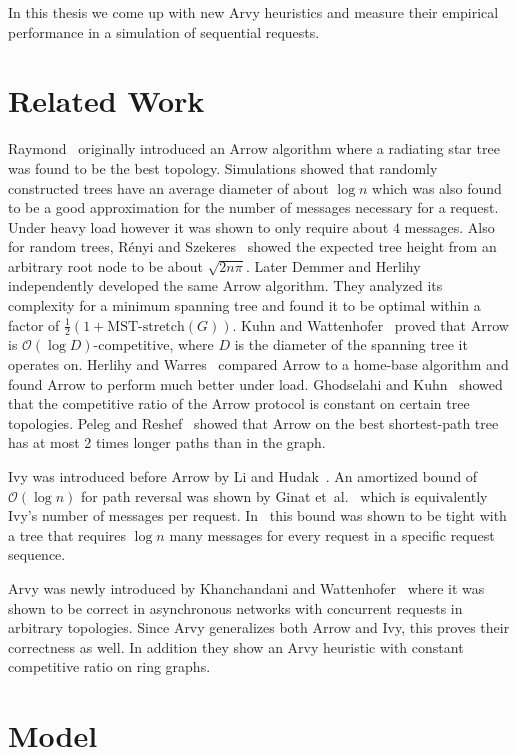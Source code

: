 \documentclass[a4paper, oneside]{discothesis}
\begin{document}
In this thesis we come up with new Arvy heuristics and measure their empirical performance in a simulation of sequential requests.

\section{Related Work}

Raymond~\cite{Ray} originally introduced an Arrow algorithm where a radiating star tree was found to be the best topology. Simulations showed that randomly constructed trees have an average diameter of about $\log n$ which was also found to be a good approximation for the number of messages necessary for a request. Under heavy load however it was shown to only require about $4$ messages. Also for random trees, R{\'e}nyi and Szekeres~\cite{Height} showed the expected tree height from an arbitrary root node to be about $\sqrt{2n\pi}$. Later Demmer and Herlihy~\cite{Arrow} independently developed the same Arrow algorithm. They analyzed its complexity for a minimum spanning tree and found it to be optimal within a factor of $\frac{1}{2}(1+\text{MST-stretch}(G))$. Kuhn and Wattenhofer~\cite{Kuhn} proved that Arrow is $\mathcal{O}(\log D)$-competitive, where $D$ is the diameter of the spanning tree it operates on. Herlihy and Warres~\cite{Tale} compared Arrow to a home-base algorithm and found Arrow to perform much better under load. Ghodselahi and Kuhn~\cite{Ghod} showed that the competitive ratio of the Arrow protocol is constant on certain tree topologies. Peleg and Reshef~\cite{Peleg} showed that Arrow on the best shortest-path tree has at most 2 times longer paths than in the graph.

Ivy was introduced before Arrow by Li and Hudak~\cite{Ivy}. An amortized bound of $\mathcal{O}(\log n)$ for path reversal was shown by Ginat et~al.~\cite{Ginat} which is equivalently Ivy's number of messages per request. In~\cite{Distr} this bound was shown to be tight with a tree that requires $\log n$ many messages for every request in a specific request sequence.

Arvy was newly introduced by Khanchandani and Wattenhofer~\cite{Arvy} where it was shown to be correct in asynchronous networks with concurrent requests in arbitrary topologies. Since Arvy generalizes both Arrow and Ivy, this proves their correctness as well. In addition they show an Arvy heuristic with constant competitive ratio on ring graphs.

\section{Model}\label{model}
\end{document}

